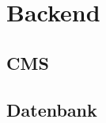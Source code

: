 \section{Backend}
\label{sec:backend}

\subsection{CMS}
\label{ss:cms}

\subsection{Datenbank}
\label{ss:datenbank}